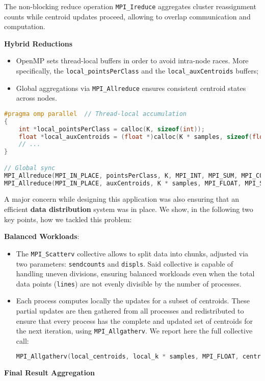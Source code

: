 \documentclass[11pt, journal]{IEEEtran}
\newcommand{\nwl}{

\vspace{11pt}

}
\begin{document}
The non-blocking reduce operation \texttt{MPI\_Ireduce} aggregates cluster reassignment counts while centroid updates proceed, allowing to overlap communication and computation.
\nwl
\noindent \textbf{Hybrid Reductions}
\begin{itemize}
    \item OpenMP sets thread-local buffers in order to avoid intra-node races. More specifically, the \texttt{local\_pointsPerClass} and the \texttt{local\_auxCentroids} buffers; 
    \item Global aggregations via \texttt{MPI\_Allreduce} ensures consistent centroid states across nodes.
\end{itemize}
\nwl
\begin{lstlisting}[language=C]
#pragma omp parallel  // Thread-local accumulation
{ 
    int *local_pointsPerClass = calloc(K, sizeof(int)); 
    float *local_auxCentroids = (float *)calloc(K * samples, sizeof(float));
    // ...
}

// Global sync
MPI_Allreduce(MPI_IN_PLACE, pointsPerClass, K, MPI_INT, MPI_SUM, MPI_COMM_WORLD); 
MPI_Allreduce(MPI_IN_PLACE, auxCentroids, K * samples, MPI_FLOAT, MPI_SUM, MPI_COMM_WORLD);\end{lstlisting}
\nwl
A major concern while designing this application was also ensuring that an efficient \textbf{data distribution} system was in place. We show, in the following two key points, how we tackled this problem:
\nwl
\noindent \textbf{Balanced Workloads}:
\begin{itemize}
    \item The \texttt{MPI\_Scatterv} collective allows to split data into chunks, adjusted via two parameters: \texttt{sendcounts} and \texttt{displs}. Said collective is capable of handling uneven divisions, ensuring balanced workloads even when the total data points (\texttt{lines}) are not evenly divisible by the number of processes.
    \item Each process computes locally the updates for a subset of centroids. These partial updates are then gathered from all processes and redistributed to ensure that every process has the complete and updated set of centroids for the next iteration, using \texttt{MPI\_Allgatherv}. We report here the full collective call:
\begin{lstlisting}[language = C]
MPI_Allgatherv(local_centroids, local_k * samples, MPI_FLOAT, centroids, centroid_sendcounts, centroid_displs, MPI_FLOAT, MPI_COMM_WORLD);
\end{lstlisting}
\end{itemize}
\nwl
\noindent \textbf{Final Result Aggregation}
\end{document}
